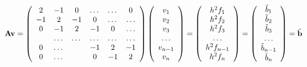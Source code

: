 \documentclass[11pt,a4wide]{article}
\begin{document}
\begin{equation}
{\bf A}{\bf v} = \left(\begin{array}{cccccc}
                           2& -1& 0 &\dots   & \dots &0 \\
                           -1 & 2 & -1 &0 &\dots &\dots \\
                           0&-1 &2 & -1 & 0 & \dots \\
                           & \dots   & \dots &\dots   &\dots & \dots \\
                           0&\dots   &  &-1 &2& -1 \\
                           0&\dots    &  & 0  &-1 & 2 \\
                      \end{array} \right)
                      \left(\begin{array}{c}
                           v_1 \\
                           v_{2}\\
                           v_{3}\\
                           \dots \\
                           v_{n-1}\\
                           v_n\\
                      \end{array} \right) = 
                       \left(\begin{array}{c}
                           h^2f_1 \\
                           h^2f_{2}\\
                           h^2f_{3}\\
                           \dots \\
                           h^2f_{n-1}\\
                           h^2f_n\\
                      \end{array} \right) = 
                      \left(\begin{array}{c}
                           \tilde{b}_1 \\
                           \tilde{b}_2\\
                           \tilde{b}_3\\
                           \dots \\
                           \tilde{b}_{n-1}\\
                           \tilde{b}_n\\
                      \end{array} \right) =
                      \tilde{{\bf b}}
\end{equation}
\end{document}
